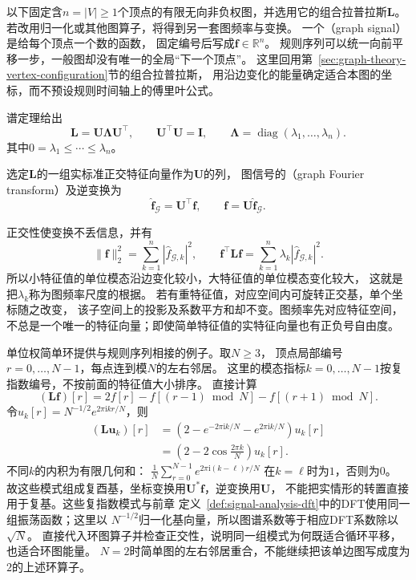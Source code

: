 以下固定含\(n=|V|\geq1\)个顶点的有限无向非负权图，并选用它的组合拉普拉斯\(\bm L\)。
若改用归一化或其他图算子，将得到另一套图频率与变换。
一个（graph signal）是给每个顶点一个数的函数，
固定编号后写成\(\bm f\in\mathbb R^n\)。
规则序列可以统一向前平移一步，一般图却没有唯一的全局“下一个顶点”。
这里回用第~\ref{sec:graph-theory-vertex-configuration}节的组合拉普拉斯，
用沿边变化的能量确定适合本图的坐标，而不预设规则时间轴上的傅里叶公式。

谱定理给出
\[
  \bm L=\bm U\bm\Lambda\bm U^\top,\qquad
  \bm U^\top\bm U=\bm I,\qquad
  \bm\Lambda=\operatorname{diag}(\lambda_1,\ldots,\lambda_n).
\]
其中\(0=\lambda_1\leq\cdots\leq\lambda_n\)。
\begin{definition}[图傅里叶变换]
  \label{def:signal-analysis-graph-fourier-transform}
  选定\(\bm L\)的一组实标准正交特征向量作为\(\bm U\)的列，
  图信号的（graph Fourier transform）及逆变换为
  \begin{equation}
    \widehat{\bm f}_{\mathcal G}=\bm U^\top\bm f,\qquad
    \bm f=\bm U\widehat{\bm f}_{\mathcal G}.
    \label{eq:signal-analysis-graph-fourier}
  \end{equation}
\end{definition}

正交性使变换不丢信息，并有
\[
  \|\bm f\|_2^2=\sum_{k=1}^n|\widehat f_{\mathcal G,k}|^2,\qquad
  \bm f^\top\bm L\bm f
  =\sum_{k=1}^n\lambda_k|\widehat f_{\mathcal G,k}|^2.
\]
所以小特征值的单位模态沿边变化较小，大特征值的单位模态变化较大，
这就是把\(\lambda_k\)称为图频率尺度的根据。
若有重特征值，对应空间内可旋转正交基，单个坐标随之改变，
该子空间上的投影及系数平方和却不变。图频率先对应特征空间，
不总是一个唯一的特征向量；即使简单特征值的实特征向量也有正负号自由度。

单位权简单环提供与规则序列相接的例子。取\(N\geq3\)，
顶点局部编号\(r=0,\ldots,N-1\)，每点连到模\(N\)的左右邻居。
这里的模态指标\(k=0,\ldots,N-1\)按复指数编号，不按前面的特征值大小排序。
直接计算
\[
  (\bm L\bm f)[r]=2f[r]-f[(r-1)\bmod N]-f[(r+1)\bmod N].
\]
令\(u_k[r]=N^{-1/2}e^{2\pi\mathrm i kr/N}\)，则
\begin{align*}
  (\bm L\bm u_k)[r]
  &=\left(2-e^{-2\pi\mathrm i k/N}-e^{2\pi\mathrm i k/N}\right)u_k[r]\\
  &=\left(2-2\cos\frac{2\pi k}{N}\right)u_k[r].
\end{align*}
不同\(k\)的内积为有限几何和：
\(\frac1N\sum_{r=0}^{N-1}e^{2\pi\mathrm i(k-\ell)r/N}\)
在\(k=\ell\)时为\(1\)，否则为\(0\)。
故这些模式组成复酉基，坐标变换用\(\bm U^*\bm f\)，逆变换用\(\bm U\)，
不能把实情形的转置直接用于复基。这些复指数模式与前章
定义~\ref{def:signal-analysis-dft}中的DFT使用同一组振荡函数；这里以
\(N^{-1/2}\)归一化基向量，所以图谱系数等于相应DFT系数除以\(\sqrt N\)。
直接代入环图算子并检查正交性，说明同一组模式为何既适合循环平移，也适合环图能量。
\(N=2\)时简单图的左右邻居重合，不能继续把该单边图写成度为\(2\)的上述环算子。

